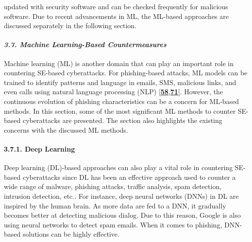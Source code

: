 {updated with security software and can be checked frequently for malicious software. Due to recent advancements in ML, the ML-based approaches are discussed separately in the following section.

\paragraph{\textit{3.7. Machine Learning-Based Countermeasures}}

Machine learning (ML) is another domain that can play an important role in countering SE-based cyberattacks. For phishing-based attacks, ML models can be trained to identify patterns and language in emails, SMS, malicious links, and even calls using natural language processing (NLP) [\href{https://www.mdpi.com/2076-3417/12/12/6042\#B58-applsci-12-06042}{\textbf{58}},\href{https://www.mdpi.com/2076-3417/12/12/6042\#B71-applsci-12-06042}{\textbf{71}}]. However, the continuous evolution of phishing characteristics can be a concern for ML-based methods. In this section, some of the most significant ML methods to counter SE-based cyberattacks are presented. The section also highlights the existing concerns with the discussed ML methods.

\paragraph{3.7.1. Deep Learning}

Deep learning (DL)-based approaches can also play a vital role in countering SE-based cyberattacks since DL has been an effective approach used to counter a wide range of malware, phishing attacks, traffic analysis, spam detection, intrusion detection, etc.. For instance, deep neural networks (DNNs) in DL are inspired by the human brain. As more data are fed to a DNN, it gradually becomes better at detecting malicious dialog. Due to this reason, Google is also using neural networks to detect spam emails. When it comes to phishing, DNN-based solutions can be highly effective. 

}
